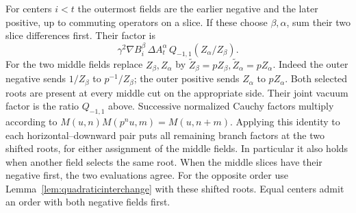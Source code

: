 For centers $i<t$ the outermost fields are the earlier negative and the
later positive, up to commuting operators on a slice. If these choose
$\beta,\alpha$, sum their two slice differences first. Their factor is
\[
   \gamma^2\nabla B_i^\beta\,\Delta A_t^\alpha\,
                      Q_{-1,1}(Z_\alpha/Z_\beta).
\]
For the two middle fields replace $Z_\beta,Z_\alpha$ by
$\widetilde Z_\beta=pZ_\beta,\widetilde Z_\alpha=pZ_\alpha$.
Indeed the outer negative sends $1/Z_\beta$ to $p^{-1}/Z_\beta$;
the outer positive sends $Z_\alpha$ to $pZ_\alpha$.
Both selected roots are present at every middle cut on the appropriate
side. Their joint vacuum factor is the ratio $Q_{-1,1}$ above.
Successive normalized Cauchy factors multiply according to
$M(u,n)M(p^nu,m)=M(u,n+m)$. Applying this identity to each
horizontal--downward pair puts all remaining branch factors at the
two shifted roots, for either assignment of the middle fields.
In particular it also holds when another field selects the same root.
When the middle slices have their negative first, the two evaluations
agree. For the opposite order use Lemma~\ref{lem:quadraticinterchange}
with these shifted roots. Equal centers admit an order with both negative
fields first.

